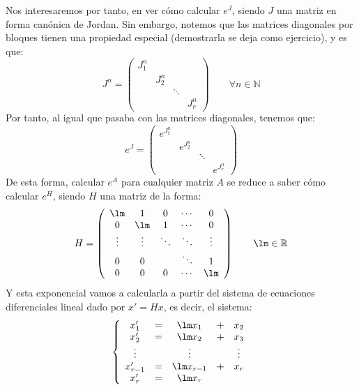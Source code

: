 \noindent
Nos interesaremos por tanto, en ver cómo calcular $e^J$, siendo $J$ una matriz en forma canónica de Jordan. Sin embargo, notemos que las matrices diagonales por bloques tienen una propiedad especial (demostrarla se deja como ejercicio), y es que:
\begin{equation*}
    J^n = \left(\begin{array}{cccc}
         J_1^n &  &  & \\
         & J_2^n &  & \\
         &  & \ddots &  \\
         &  &  & J_r^n 
    \end{array}\right) \qquad \forall n\in \mathbb{N}
\end{equation*}
Por tanto, al igual que pasaba con las matrices diagonales, tenemos que:
\begin{equation*}
    e^J = \left(\begin{array}{cccc}
         e^{J_1^n} &  &  & \\
         & e^{J_2^n} &  & \\
         &  & \ddots &  \\
         &  &  & e^{J_r^n }
    \end{array}\right) 
\end{equation*}
De esta forma, calcular $e^A$ para cualquier matriz $A$ se reduce a saber cómo calcular $e^H$, siendo $H$ una matriz de la forma:
\begin{equation*}
    H = \left(\begin{array}{ccccc}
            \lm & 1 & 0 & \cdots & 0 \\
            0 & \lm & 1 & \cdots & 0 \\
         \vdots & \vdots & \ddots & \ddots & \vdots \\
        0& 0 &   &\ddots & 1 \\
        0& 0 & 0 &\cdots & \lm 
    \end{array}\right) \qquad \lm \in \mathbb{R}
\end{equation*}
Y esta exponencial vamos a calcularla a partir del sistema de ecuaciones diferenciales lineal dado por $x' = Hx$, es decir, el sistema:
\begin{equation*}
    \left\{\begin{array}{ccccc}
            x_1' &=& \lm x_1 & + & x_2 \\
            x_2' &=& \lm x_2 &+& x_3 \\
            \vdots & & \vdots && \vdots \\
            x_{r-1}' &=& \lm x_{r-1} &+& x_r \\
            x_r' &=& \lm x_r &&
    \end{array}\right.
\end{equation*}
